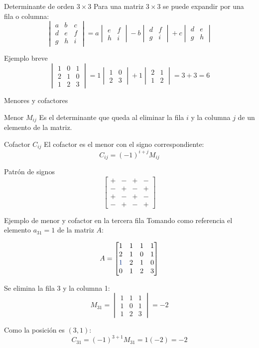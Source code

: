 \documentclass[aspectratio=169]{beamer}
\newcommand{\mat}[1]{\begin{bmatrix}#1\end{bmatrix}}
\newcommand{\detm}[1]{\begin{vmatrix}#1\end{vmatrix}}
\begin{document}
\begin{frame}{Determinante de orden $3\times3$}
Para una matriz $3\times3$ se puede expandir por una fila o columna:
\[
\detm{a&b&c\\d&e&f\\g&h&i}
=a\detm{e&f\\h&i}-b\detm{d&f\\g&i}+c\detm{d&e\\g&h}
\]

\begin{exampleblock}{Ejemplo breve}
\[
\detm{1&0&1\\2&1&0\\1&2&3}
=1\detm{1&0\\2&3}+1\detm{2&1\\1&2}=3+3=6
\]
\end{exampleblock}
\end{frame}

\begin{frame}{Menores y cofactores}
\begin{block}{Menor $M_{ij}$}
Es el determinante que queda al eliminar la fila $i$ y la columna $j$ de un elemento de la matriz.
\end{block}

\begin{block}{Cofactor $C_{ij}$}
El cofactor es el menor con el signo correspondiente:
\[
C_{ij}=(-1)^{i+j}M_{ij}
\]
\end{block}

\begin{exampleblock}{Patrón de signos}
\[
\mat{+&-&+&-\\-&+&-&+\\+&-&+&-\\-&+&-&+}
\]
\end{exampleblock}
\end{frame}

\begin{frame}[shrink=5]{Ejemplo de menor y cofactor en la tercera fila}
Tomando como referencia el elemento $a_{31}=1$ de la matriz $A$:

\[
A=\mat{
1&1&1&1\\
2&1&0&1\\
\color{azulPUCE}{1}&2&1&0\\
0&1&2&3}
\]

Se elimina la fila 3 y la columna 1:
\[
M_{31}=\detm{1&1&1\\1&0&1\\1&2&3}=-2
\]

Como la posición es $(3,1)$:
\[
C_{31}=(-1)^{3+1}M_{31}=1(-2)=\boxed{-2}
\]
\end{frame}
\end{document}
